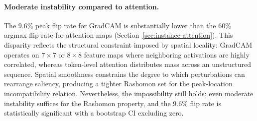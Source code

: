 

\paragraph{Moderate instability compared to attention.}
The 9.6\% peak flip rate for GradCAM is substantially lower than the 60\%
argmax flip rate for attention maps (Section~\ref{sec:instance-attention}).
This disparity reflects the structural constraint imposed by spatial
locality: GradCAM operates on $7 \times 7$ or $8 \times 8$ feature maps
where neighboring activations are highly correlated, whereas token-level
attention distributes mass across an unstructured sequence.  Spatial
smoothness constrains the degree to which perturbations can rearrange
saliency, producing a tighter Rashomon set for the peak-location
incompatibility relation.  Nevertheless, the impossibility still holds:
even moderate instability suffices for the Rashomon property, and the 9.6\%
flip rate is statistically significant with a bootstrap CI excluding zero.
